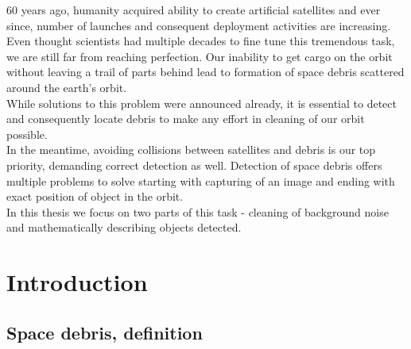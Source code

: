 \documentclass[12pt, a4paper, oneside]{book}
\begin{document}
60 years ago, humanity acquired ability to create artificial satellites and ever since, number of launches and consequent deployment activities are increasing.
Even thought scientists had multiple decades to fine tune this tremendous task, we are still far from reaching perfection.
Our inability to get cargo on the orbit without leaving a trail of parts behind lead to formation of space debris scattered around the earth's orbit.\\
While solutions to this problem were announced already, it is essential to detect and consequently locate debris to make any effort in cleaning of our orbit possible.\\
In the meantime, avoiding collisions between satellites and debris is our top priority, demanding correct detection as well.
Detection of space debris offers multiple problems to solve starting with capturing of an image and ending with exact position of object in the orbit.\\
In this thesis we focus on two parts of this task - cleaning of background noise and mathematically describing objects detected.

\chapter{Introduction}

\section{Space debris, definition}
\end{document}
